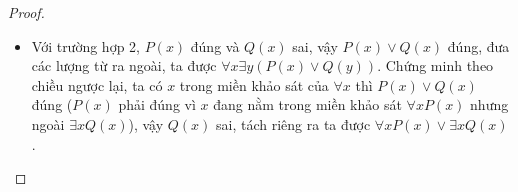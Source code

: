 \begin{proof}
\begin{enumerate}[label=\alph*)]
\begin{itemize}
            \item Với trường hợp 2, $P(x)$ đúng và $Q(x)$ sai, vậy $P(x)\lor Q(x)$ đúng, đưa các lượng từ ra ngoài, ta được $\forall x\exists y(P(x)\lor Q(y))$. Chứng minh theo chiều ngược lại, ta có $x$ trong miền khảo sát của $\forall x$ thì $P(x)\lor Q(x)$ đúng ($P(x)$ phải đúng vì $x$ đang nằm trong miền khảo sát $\forall xP(x)$ nhưng ngoài $\exists xQ(x)$), vậy $Q(x)$ sai, tách riêng ra ta được $\forall xP(x)\lor\exists xQ(x)$.
        \end{itemize}
    \end{enumerate}
\end{proof}
